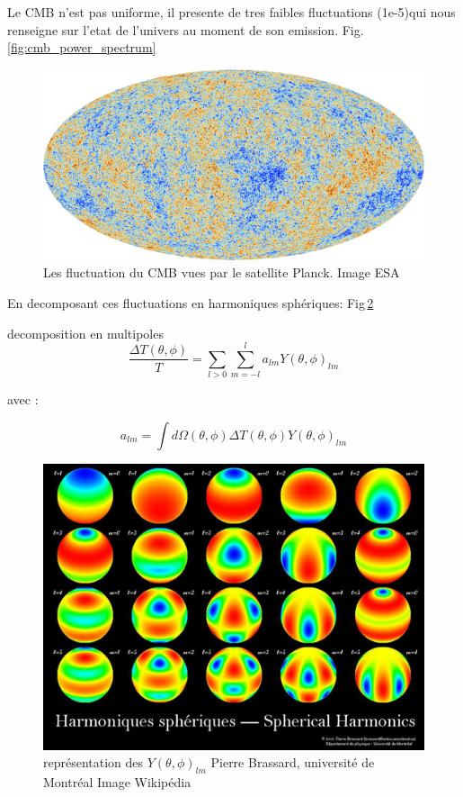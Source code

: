 Le CMB n'est pas uniforme, il presente de tres faibles fluctuations (1e-5)qui nous renseigne sur l'etat de l'univers au moment de son emission.
Fig. \ref{fig:cmb_power_spectrum}

\begin{figure}[bth]
        \includegraphics[width=.95\linewidth]{img/01/CMB.jpeg} 
        \caption{Les fluctuation du CMB vues par le satellite Planck. 
        Image ESA}
 		\label{fig:cmb}
\end{figure}


En decomposant ces fluctuations en harmoniques sphériques:
Fig\,\ref{fig:harmoniques_spheriques}

decomposition en multipoles
\begin{equation}
 \frac{\Delta T(\theta,\phi)}{T} = \sum_{l>0} \sum_{m=-l}^l a_{lm} Y(\theta,\phi)_{lm}
\end{equation}

avec : 

\begin{equation}
a_{lm}= \int d\Omega(\theta,\phi) \Delta T (\theta,\phi) Y(\theta,\phi)_{lm}
\end{equation}

\begin{figure}[bth]
        \includegraphics[width=.95\linewidth]{img/01/harmoniques_spheriques.jpeg} 
        \caption{
        représentation des $Y(\theta,\phi)_{lm}$
 Pierre Brassard, université de Montréal 
        Image Wikipédia}
 		\label{fig:harmoniques_spheriques}
\end{figure}


